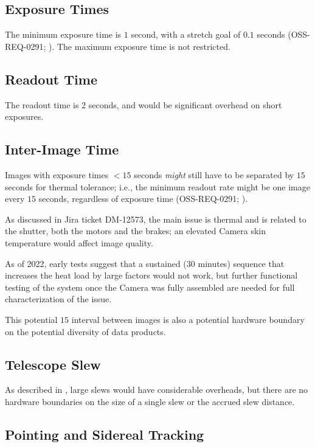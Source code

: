 \subsection{Exposure Times}

The minimum exposure time is $1$ second, with a stretch goal of $0.1$ seconds 
(OSS-REQ-0291; ). 
The maximum exposure time is not restricted.

\subsection{Readout Time}

The readout time is $2$ seconds, and would be significant overhead on short exposures.

\subsection{Inter-Image Time}

Images with exposure times $<15$ seconds {\it might} still have to be separated by $15$ 
seconds for thermal tolerance; i.e., the minimum readout rate might be one image every 
$15$ seconds, regardless of exposure time (OSS-REQ-0291; ).

As discussed in Jira ticket DM-12573, the main issue is thermal and is related to the 
shutter, both the motors and the brakes; an elevated Camera skin temperature would affect 
image quality.

As of 2022, early tests suggest that a sustained (30 minutes) sequence that increases the 
heat load by large factors would not work, but further functional testing of the system 
once the Camera was fully assembled are needed for full characterization of the issue.

This potential $15$ interval between images is also a potential hardware boundary on the 
potential diversity of data products.

\subsection{Telescope Slew}

As described in , large slews would have considerable overheads, 
but there are no hardware boundaries on the size of a single slew or the accrued slew 
distance.

\subsection{Pointing and Sidereal Tracking}

